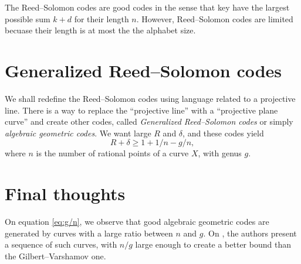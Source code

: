 \documentclass[11pt]{amsart}
\theoremstyle{theorem}
\theoremstyle{definition}
\theoremstyle{example}
\theoremstyle{remark}
\numberwithin{equation}{section}
\begin{document}
The Reed--Solomon codes are good codes in the sense that key have the largest possible sum $k + d$ for their length $n$. However, Reed--Solomon codes are limited becuase their length is at most the the alphabet size.

\section{Generalized Reed--Solomon codes} \label{s:grs}
We shall redefine the Reed--Solomon codes using language related to a projective line. There is a way to replace the ``projective line'' with a ``projective plane curve'' and create other codes, called \emph{Generalized Reed--Solomon codes} or simply \emph{algebraic geometric codes}. We want large $R$ and $\delta$, and these codes yield 
	\begin{equation}
		\label{eq:g/n} R + \delta \ge 1 + 1/n - g/n,
	\end{equation}
	where $n$ is the number of rational points of a curve $X$, with genus $g$.

\section{Final thoughts} \label{s:tvz} On equation \eqref{eq:g/n}, we observe that good algebraic geometric codes are generated by curves with a large ratio between $n$ and $g$. On \cite{TVZ82}, the authors present a sequence of such curves, with $n/g$ large enough to create a better bound than the Gilbert--Varshamov one.

\printbibliography
\end{document}
